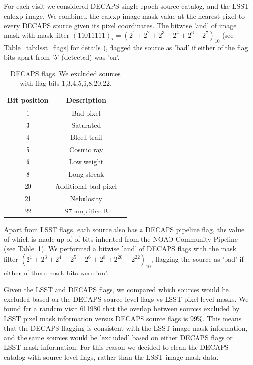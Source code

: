 \documentclass[DM,lsstdraft,toc,usenatbib]{lsstdoc}
\begin{document}
For each  visit we considered DECAPS single-epoch source catalog, and the LSST calexp image. We combined the calexp image mask value at the nearest pixel to every DECAPS source given its pixel coordinates.  The bitwise 'and' of image mask with mask filter $(11011111)_{2} = (2^{1}+2^{2}+2^{3}+2^{4}+2^{6}+2^{7})_{10}$ (see Table~\ref{tab:lsst_flags} for details ), flagged the source   as 'bad' if either of the flag bits apart from '5' (detected) was 'on'. 

\begin{table}
\centering
\caption{DECAPS flags. We excluded sources with flag bits 1,3,4,5,6,8,20,22.}
\label{tab:decaps_flags}
\begin{tabular}{ ccc} 
\hline
Bit position & Description \\ 
\hline
1  &     Bad pixel            \\ 
3  &    Saturated      \\ 
4  &    Bleed trail      \\ 
5  &    Cosmic ray       \\ 
6  &    Low weight      \\ 
8  &    Long streak      \\ 
20  &   Additional bad pixel    \\ 
21 &    Nebulosity     \\ 
22  &   S7 amplifier B        \\ 
\hline
\end{tabular}
\end{table}

Apart from LSST flags, each source also has a DECAPS pipeline flag, the value of which is made up of of bits inherited from the NOAO Community Pipeline (see Table~\ref{tab:decaps_flags}). We performed a bitwise 'and' of DECAPS flags with the mask filter $(2^{1}+ 2^{3}+  2^{4}+  2^{5}+  2^{6}+  2^{8}+  2^{20}+  2^{22})_{10}$, flagging the source as 'bad' if either of these mask bits were 'on'. 

Given the LSST and DECAPS flags, we compared which sources would be excluded based on the DECAPS source-level flags vs LSST pixel-level masks. We found for a random visit  611980  that the overlap between sources excluded by LSST pixel mask information versus DECAPS source flags is 99\%.  This means that the DECAPS flagging is consistent with the LSST image mask information, and the same sources would be 'excluded' based on either DECAPS flags or LSST mask information. For this reason we decided to clean the DECAPS catalog with  source level flags, rather than the LSST image mask data. 
 
\end{document}
